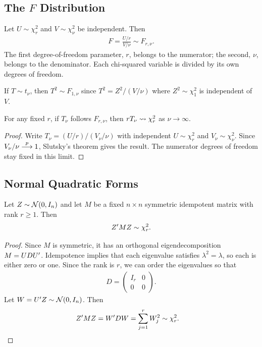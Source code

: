 \documentclass[a4paper,12pt]{article}
\begin{document}
\subsection{The \texorpdfstring{$F$}{F} Distribution}

\begin{definition}[$F$ Distribution]
	Let $U\sim\chi_r^2$ and $V\sim\chi_\nu^2$ be independent.
	Then
	\begin{align}
		F=\frac{U/r}{V/\nu}\sim F_{r,\nu}.
	\end{align}
	The first degree-of-freedom parameter, $r$, belongs to the numerator;
	the second, $\nu$, belongs to the denominator.
	Each chi-squared variable is divided by its own degrees of freedom.
\end{definition}

\begin{remark}
	If $T\sim t_\nu$, then $T^2\sim F_{1,\nu}$
	since $T^2={Z^2}/(V/\nu)$ where $Z^2\sim\chi_1^2$ is independent of $V$.
\end{remark}

\begin{proposition}
	For any fixed $r$, if $T_\nu$ follows $F_{r,\nu}$, then $rT_\nu\overset{}{\leadsto}\chi_r^2$ as $\nu\to\infty$.
\end{proposition}
\begin{proof}
	Write $T_\nu=(U/r)/(V_\nu/\nu)$ with independent
	$U\sim\chi_r^2$ and $V_\nu\sim\chi_\nu^2$.
	Since $V_\nu/\nu\overset{p}{\longrightarrow}1$, Slutsky's theorem gives the result.
	The numerator degrees of freedom stay fixed in this limit.
\end{proof}

\subsection{Normal Quadratic Forms}

\begin{proposition}\label{thm-normal-quadratic-form}
	Let $Z\sim\operatorname{\mathcal{N}}(0,I_n)$ and let $M$ be a fixed $n\times n$ symmetric idempotent matrix
	with rank $r\ge1$. Then
	\begin{align}
		Z^{\prime} MZ\sim\chi_r^2.
	\end{align}
\end{proposition}
\begin{proof}
	Since $M$ is symmetric, it has an orthogonal eigendecomposition $M=UDU^{\prime}$.
	Idempotence implies that each eigenvalue satisfies $\lambda^2=\lambda$,
	so each is either zero or one.
	Since the rank is $r$, we can order the eigenvalues so that
	\begin{align*}
		D=\begin{pmatrix}I_r&0\\0&0\end{pmatrix}.
	\end{align*}
	Let $W=U^{\prime} Z\sim\operatorname{\mathcal{N}}(0,I_n)$. Then
	\begin{align*}
		Z^{\prime} MZ&=W^{\prime} DW=\sum_{j=1}^rW_j^2\sim\chi_r^2.
		\qedhere
	\end{align*}
\end{proof}
\end{document}
